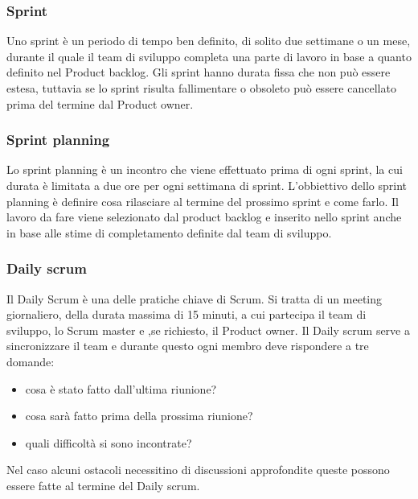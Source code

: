 \subsubsection{Sprint}
Uno sprint è un periodo di tempo ben definito, di solito due settimane o un mese, durante il quale il team di sviluppo completa una parte di lavoro in base a quanto definito nel Product backlog.
Gli sprint hanno durata fissa che non può essere estesa, tuttavia se lo sprint risulta fallimentare o obsoleto può essere cancellato prima del termine dal Product owner.

\subsubsection{Sprint planning}
Lo sprint planning è un incontro che viene effettuato prima di ogni sprint, la cui durata è limitata a due ore per ogni settimana di sprint. L'obbiettivo dello sprint planning è definire cosa rilasciare al termine del prossimo sprint e come farlo.
Il lavoro da fare viene selezionato dal product backlog e inserito nello sprint anche in base alle stime di completamento definite dal team di sviluppo.

\subsubsection{Daily scrum}
Il Daily Scrum è una delle pratiche chiave di Scrum. Si tratta di un meeting giornaliero, della durata massima di 15 minuti, a cui partecipa il team di sviluppo, lo Scrum master e ,se richiesto, il Product owner. Il Daily scrum serve a sincronizzare il team e durante questo ogni membro deve rispondere a tre domande:
\begin{itemize}
    \item cosa è stato fatto dall'ultima riunione?
    \item cosa sarà fatto prima della prossima riunione?
    \item quali difficoltà si sono incontrate?
\end{itemize}
Nel caso alcuni ostacoli necessitino di discussioni approfondite queste possono essere fatte al termine del Daily scrum.

